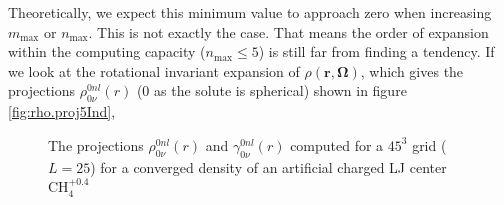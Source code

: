 Theoretically, we expect this minimum value to approach zero when
increasing $m_{\max}$ or $n_{\max}$. This is not exactly the case.
That means the order of expansion within the computing capacity ($n_{\max}\leq5$)
is still far from finding a tendency. If we look at the rotational
invariant expansion of $\rho(\mathbf{r},\mathbf{\Omega})$, which
gives the projections $\rho_{0\nu}^{0nl}(r)$ (0 as the solute is
spherical) shown in figure \ref{fig:rho.proj5Ind}, 
\begin{figure}[h]
\begin{centering}
\par\end{centering}
\begin{centering}
\par\end{centering}
\caption[$\gamma_{0\nu}^{0nl}(r)$ of an artificial charged LJ center $\mathrm{CH}_{4}^{+0.4}$]{The projections $\rho_{0\nu}^{0nl}(r)$ and $\gamma_{0\nu}^{0nl}(r)$
computed for a $45^{3}$ grid ($L=25$) for a converged density of
an artificial charged LJ center $\mathrm{CH}_{4}^{+0.4}$}
\end{figure}
